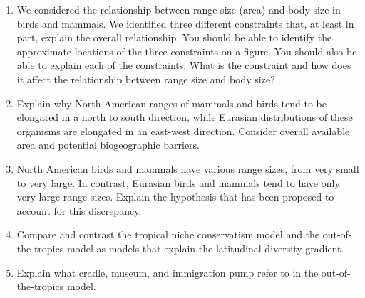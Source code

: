 \documentclass[letterpaper]{tufte-handout}
\begin{document}
\begin{enumerate}
\item  We considered the relationship between range size (area) and body size
  in birds and mammals. We identified three different constraints that,
  at least in part, explain the overall relationship. You should be able
  to identify the approximate locations of the three constraints on a
  figure. You should also be able to explain each of the constraints:
  What is the constraint and how does it affect the relationship between
  range size and body size?
  
\item   Explain why North American ranges of mammals and birds tend to be
  elongated in a north to south direction, while Eurasian distributions
  of these organisms are elongated in an east-west direction. Consider
  overall available area and potential biogeographic barriers.
  
\item  North American birds and mammals have various range sizes, from very
  small to very large. In contrast, Eurasian birds and mammals tend to
  have only very large range sizes. Explain the hypothesis that has been
  proposed to account for this discrepancy.  
  
\item Compare and contrast the tropical niche conservatism model and the
out-of-the-tropics model as models that explain the latitudinal diversity gradient.

\item Explain what cradle, museum, and immigration pump refer to in the 
out-of-the-tropics model.

\end{enumerate}
\end{document}
